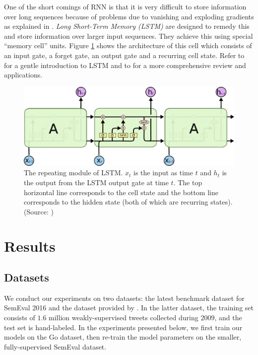 \documentclass{article} %
\begin{document}
One of the short comings of RNN is that it is very difficult to store information over long sequences because of problems due to vanishing and exploding gradients as explained in \cite{hochreiter2001gradient}.
{\it Long Short-Term Memory (LSTM)} \cite{hochreiter1997long} are designed to remedy this and store information over larger input sequences.
They achieve this using special ``memory cell'' units. 
Figure \ref{fig:lstm} shows the architecture of this cell which consists of an input gate, a forget gate, an output gate and a recurring cell state. 
Refer to \cite{colah} for a gentle introduction to LSTM and to \cite{graves2012supervised} for a more comprehensive review and applications.

\begin{figure}
	\centering
	\includegraphics[width=\textwidth]{figs/LSTM.png}
	\caption{The repeating module of LSTM. $x_t$ is the input as time $t$ and $h_t$ is the output from the LSTM output gate at time $t$. The top horizontal line corresponds to the cell state and the bottom line corresponds to the hidden state (both of which are recurring states).
	(Source: \cite{colah})}
	\label{fig:lstm}
\end{figure}

\section{Results}

\subsection{Datasets}
We conduct our experiments on two datasets: the latest benchmark dataset for SemEval 2016 and the dataset provided by \cite{go2009twitter}. In the latter dataset, the training set consists of $1.6$ million weakly-supervised tweets collected during $2009$, and the test set is hand-labeled. In the experiments presented below, we first train our models on the Go dataset, then re-train the model parameters on the smaller, fully-supervised SemEval dataset.
\end{document}
